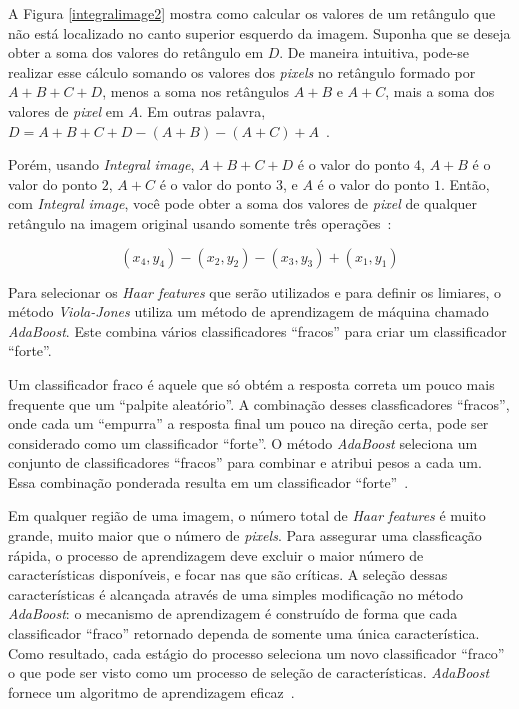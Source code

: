 A Figura \ref{integralimage2} mostra como calcular os valores de um retângulo que não está localizado no canto superior esquerdo da imagem. Suponha que se deseja obter a soma dos valores do retângulo em $\displaystyle D$. De maneira intuitiva, pode-se realizar esse cálculo somando os valores dos \textit{pixels} no retângulo formado por $\displaystyle A+B+C+D$, menos a soma nos retângulos $\displaystyle A+B$ e $\displaystyle A+C$, mais a soma dos valores de \textit{pixel} em $\displaystyle A$. Em outras palavra, $\displaystyle D = A+B+C+D-(A+B)-(A+C)+A$~\cite{servodetection, violajones}.

Porém, usando \textit{Integral image}, $\displaystyle A+B+C+D$ é o valor do ponto $\displaystyle 4$, $\displaystyle A+B$ é o valor do ponto $\displaystyle 2$, $\displaystyle A+C$ é o valor do ponto $\displaystyle 3$, e $\displaystyle A$ é o valor do ponto $\displaystyle 1$. Então, com \textit{Integral image}, você pode obter a soma dos valores de \textit{pixel} de qualquer retângulo na imagem original usando somente três operações~\cite{servodetection, violajones}:

	\begin{equation}
		(x_4,y_4) - (x_2,y_2) - (x_3,y_3) + (x_1,y_1)
		\label{equacaointegralimage}
	\end{equation} 

Para selecionar os \textit{Haar features} que serão utilizados e para definir os limiares, o método \textit{Viola-Jones} utiliza um método de aprendizagem de máquina chamado \textit{AdaBoost}. Este combina vários classificadores ``fracos'' para criar um classificador ``forte''. 

Um classificador fraco é aquele que só obtém a resposta correta um pouco mais frequente que um ``palpite aleatório''. A combinação desses classficadores ``fracos'', onde cada um ``empurra'' a resposta final um pouco na direção certa, pode ser considerado como um classificador ``forte''. O método \textit{AdaBoost} seleciona um conjunto de classificadores ``fracos'' para combinar e atribui pesos a cada um. Essa combinação ponderada resulta em um classificador ``forte''~\cite{servodetection}.

Em qualquer região de uma imagem, o número total de \textit{Haar features} é muito grande, muito maior que o número de \textit{pixels}. Para assegurar uma classficação rápida, o processo de aprendizagem deve excluir o maior número de características disponíveis, e focar nas que são críticas. A seleção dessas características é alcançada através de uma simples modificação no método \textit{AdaBoost}: o mecanismo de aprendizagem é construído de forma que cada classificador ``fraco'' retornado dependa de somente uma única característica. Como resultado, cada estágio do processo seleciona um novo classificador ``fraco'' o que pode ser visto como um processo de seleção de características. \textit{AdaBoost} fornece um algoritmo de aprendizagem eficaz~\cite{violajones}.

